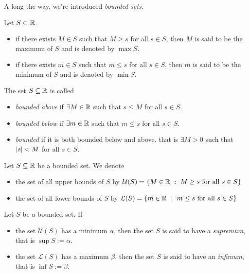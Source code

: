 A long the way, we're introduced \emph{bounded sets.}
\begin{definition}
  Let $S\subset\R$.
  \begin{itemize}
    \item if there exists $M\in S$ such that 
      $M\geq s$ for all $s\in S$, then $M$ is said to be the
      maximum of $S$ and is denoted by $\max S$.
    \item if there exists $m\in S$ such that 
      $m\leq s$ for all $s\in S$, then $m$ is said to be the
      minimum of $S$ and is denoted by $\min S$.
  \end{itemize}
\end{definition}
\begin{definition}
  The set $S\subseteq\R$ is called
  \begin{itemize}
    \item \emph{bounded above} if $\exists M\in\R$ such that 
      $s\leq M$ for all $s\in S$.
    \item \emph{bounded below} if $\exists m\in\R$  such that
      $m\leq s$ for all $s\in S$.
    \item \emph{bounded} if it is both bounded below and above, 
      that is $\exists M>0$ such that $\lvert s\rvert<M$ for all $s\in S$.
  \end{itemize}
\end{definition}
\begin{definition}
  Let $S\subseteq\R$ be a bounded set. We denote
  \begin{itemize}
    \item the set of all upper bounds of $S$ by 
      $\mathcal{U}(S)=\set{M\in\R}{M\geq s \text{ for all }s\in S}$
    \item the set of all lower bounds of $S$ by
      $\mathcal{L}(S)=\set{m\in\R}{m\leq s\text{ for all }s\in S}$
  \end{itemize}
\end{definition}
\begin{definition}
  Let $S$ be a bounded set. If
  \begin{itemize}
    \item the set $\mathcal{U}(S)$ has a minimum $\alpha$, then the set
      $S$ is said to have a \emph{supremum}, that is
      $\sup S:=\alpha$.
    \item the set $\mathcal{L}(S)$ has a maximum $\beta$,
      then the set $S$ is said to have an \emph{infimum}, that is
      $\inf S:=\beta$.
  \end{itemize}
\end{definition}

